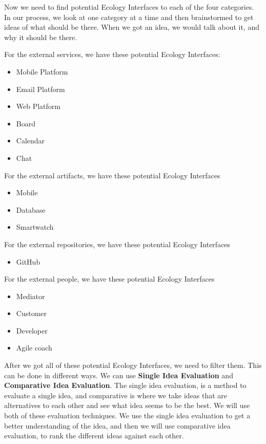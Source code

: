 Now we need to find potential Ecology Interfaces to each of the four categories.
In our process, we look at one category at a time and then brainstormed to get ideas of what should be there.
When we got an idea, we would talk about it, and why it should be there.

For the external services, we have these potential Ecology Interfaces:

\begin{itemize}
    \item Mobile Platform
    \item Email Platform
    \item Web Platform
    \item Board
    \item Calendar
    \item Chat 
\end{itemize}

For the external artifacts, we have these potential Ecology Interfaces

\begin{itemize}
    \item Mobile
    \item Database
    \item Smartwatch
\end{itemize}

For the external repositories, we have these potential Ecology Interfaces

\begin{itemize}
    \item GitHub
\end{itemize}

For the external people, we have these potential Ecology Interfaces

\begin{itemize}
    \item Mediator
    \item Customer
    \item Developer
    \item Agile coach
\end{itemize}

After we got all of these potential Ecology Interfaces, we need to filter them.
This can be done in different ways.
We can use \textbf{Single Idea Evaluation} and \textbf{Comparative Idea Evaluation}.
The single idea evaluation, is a method to evaluate a single idea, and comparative is where we take ideas that are alternatives to each other and see what idea seems to be the best.
We will use both of these evaluation techniques.
We use the single idea evaluation to get a better understanding of the idea, and then we will use comparative idea evaluation, to rank the different ideas against each other.

